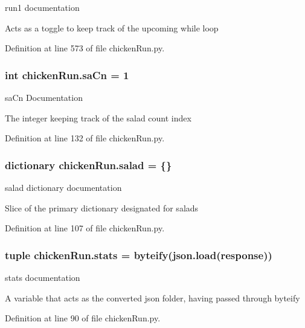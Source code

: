 run1 documentation 

Acts as a toggle to keep track of the upcoming while loop 

Definition at line 573 of file chicken\-Run.\-py.

\hypertarget{namespacechickenRun_a42925316b1c2c28a1940ff66833110f5}{
\subsubsection[{sa\-Cn}]{\setlength{\rightskip}{0pt plus 5cm}int chicken\-Run.\-sa\-Cn = 1}}\label{namespacechickenRun_a42925316b1c2c28a1940ff66833110f5}


sa\-Cn Documentation 

The integer keeping track of the salad count index 

Definition at line 132 of file chicken\-Run.\-py.

\hypertarget{namespacechickenRun_a3db3ea06f949903e3357c4448a7d4f80}{
\subsubsection[{salad}]{\setlength{\rightskip}{0pt plus 5cm}dictionary chicken\-Run.\-salad = \{\}}}\label{namespacechickenRun_a3db3ea06f949903e3357c4448a7d4f80}


salad dictionary documentation 

Slice of the primary dictionary designated for salads 

Definition at line 107 of file chicken\-Run.\-py.

\hypertarget{namespacechickenRun_ad9b9fe9f3099e83f2b0ec3e086a4cac2}{
\subsubsection[{stats}]{\setlength{\rightskip}{0pt plus 5cm}tuple chicken\-Run.\-stats = {\bf byteify}(json.\-load({\bf response}))}}\label{namespacechickenRun_ad9b9fe9f3099e83f2b0ec3e086a4cac2}


stats documentation 

A variable that acts as the converted json folder, having passed through byteify 

Definition at line 90 of file chicken\-Run.\-py.

